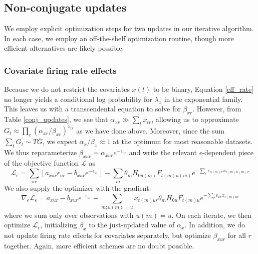 \documentclass[10pt,letterpaper]{article}
\begin{document}
\subsection{Non-conjugate updates}
\label{non-conj}
We employ explicit optimization steps for two updates in our iterative algorithm. In each case, we employ an off-the-shelf optimization routine, though more efficient alternatives are likely possible.

\subsubsection{Covariate firing rate effects}
\label{beta_x}
Because we do not restrict the covariates $x(t)$ to be binary, Equation \ref{eff_rate} no longer yields a conditional log probability for $\lambda_x$ in the exponential family. This leaves us with a transcendental equation to solve for $\beta_{xr}$. However, from Table \ref{conj_updates}, we see that $\alpha_{xr} \gg \sum_t x_{tr}$, allowing us to approximate $G_t \approx \prod_r (\alpha_{xr}/\beta_{xr})^{x_{tr}}$ as we have done above. Moreover, since the sum $\sum_t G_t \sim T\overline{G}$, we expect $\alpha_x / \beta_x \approx 1$ at the optimum for most reasonable datasets. We thus reparameterize $\beta_{xur} = \alpha_{xur}e^{-\epsilon_{ur}}$ and write the relevant $\epsilon$-dependent piece of the objective function $\mathcal{L}$ as
\begin{equation}
    \label{fropt}
    \mathcal{L}_\epsilon = \sum_{ur} \left[a_{xur}\epsilon_{ur} - b_{xur}e^{-\epsilon_{ur}} \right] - \sum_m \overline{\theta}_m H_{0u(m)} F_{t(m)u(m)}
    e^{-\sum_r \epsilon_{u(m)r} x_{t(m)u(m)r}}
\end{equation}
We also supply the optimizer with the gradient:
\begin{equation}
    \label{frgrad}
    \nabla_\epsilon \mathcal{L}_\epsilon = a_{xur} - b_{xur}e^{-\epsilon_{ur}}  - \sum_{m; u(m) = u} x_{t(m)ur} \overline{\theta}_m H_{0u} F_{t(m)u}
    e^{-\sum_r \epsilon_{ur} x_{t(m)ur}}
\end{equation}
where we sum only over observations with $u(m) = u$. On each iterate, we then optimize $\mathcal{L}_\epsilon$, initializing $\beta_x$ to the just-updated value of $\alpha_x$. In addition, we do not update firing rate effects for covariates separately, but optimize $\beta_{xur}$ for all $r$ together. Again, more efficient schemes are no doubt possible.
\end{document}
